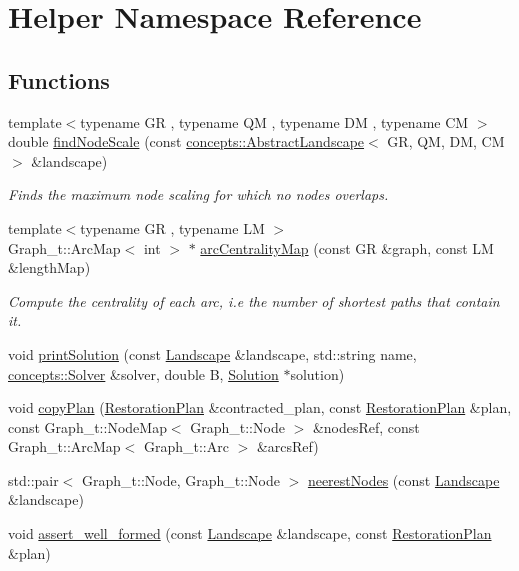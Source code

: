 \hypertarget{namespace_helper}{}\section{Helper Namespace Reference}
\label{namespace_helper}
\subsection*{Functions}
\begin{DoxyCompactItemize}
\item 
{\footnotesize template$<$typename GR , typename QM , typename DM , typename CM $>$ }\\double \hyperlink{namespace_helper_ac8afc6aaaf4247e34fdc83469b06af6e}{find\+Node\+Scale} (const \hyperlink{classconcepts_1_1_abstract_landscape}{concepts\+::\+Abstract\+Landscape}$<$ GR, QM, DM, CM $>$ \&landscape)
\begin{DoxyCompactList}\small\item\em Finds the maximum node scaling for which no nodes overlaps. \end{DoxyCompactList}\item 
{\footnotesize template$<$typename GR , typename LM $>$ }\\Graph\+\_\+t\+::\+Arc\+Map$<$ int $>$ $\ast$ \hyperlink{namespace_helper_a41dff70c57f7082754959faf43d693a4}{arc\+Centrality\+Map} (const GR \&graph, const LM \&length\+Map)
\begin{DoxyCompactList}\small\item\em Compute the centrality of each arc, i.\+e the number of shortest paths that contain it. \end{DoxyCompactList}\item 
void \hyperlink{namespace_helper_a3cc49f3178d4ab02f9253076fe399df7}{print\+Solution} (const \hyperlink{class_landscape}{Landscape} \&landscape, std\+::string name, \hyperlink{classconcepts_1_1_solver}{concepts\+::\+Solver} \&solver, double B, \hyperlink{class_solution}{Solution} $\ast$solution)
\item 
void \hyperlink{namespace_helper_a2e40eca9f4613caf5319d76356fc6b44}{copy\+Plan} (\hyperlink{class_restoration_plan}{Restoration\+Plan} \&contracted\+\_\+plan, const \hyperlink{class_restoration_plan}{Restoration\+Plan} \&plan, const Graph\+\_\+t\+::\+Node\+Map$<$ Graph\+\_\+t\+::\+Node $>$ \&nodes\+Ref, const Graph\+\_\+t\+::\+Arc\+Map$<$ Graph\+\_\+t\+::\+Arc $>$ \&arcs\+Ref)
\item 
std\+::pair$<$ Graph\+\_\+t\+::\+Node, Graph\+\_\+t\+::\+Node $>$ \hyperlink{namespace_helper_ad2822186832ad10787811db7d44d60cd}{neerest\+Nodes} (const \hyperlink{class_landscape}{Landscape} \&landscape)
\item 
void \hyperlink{namespace_helper_a96cce3e519db1c92a36ccb954ebfb855}{assert\+\_\+well\+\_\+formed} (const \hyperlink{class_landscape}{Landscape} \&landscape, const \hyperlink{class_restoration_plan}{Restoration\+Plan} \&plan)
\end{DoxyCompactItemize}


